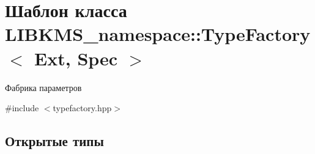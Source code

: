 \hypertarget{classLIBKMS__namespace_1_1TypeFactory}{\section{Шаблон класса L\-I\-B\-K\-M\-S\-\_\-namespace\-:\-:Type\-Factory$<$ Ext, Spec $>$}
\label{classLIBKMS__namespace_1_1TypeFactory}
}


Фабрика параметров  




{\ttfamily \#include $<$typefactory.\-hpp$>$}

\subsection*{Открытые типы}
